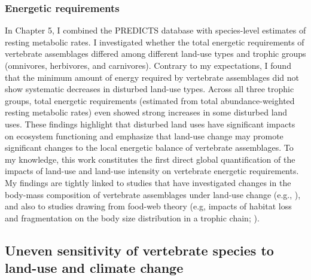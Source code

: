 \subsubsection{Energetic requirements}
In Chapter 5, I combined the PREDICTS database with species-level estimates of resting metabolic rates. I investigated whether the total energetic requirements of vertebrate assemblages differed among different land-use types and trophic groups (omnivores, herbivores, and carnivores). Contrary to my expectations, I found that the minimum amount of energy required by vertebrate assemblages did not show systematic decreases in disturbed land-use types. Across all three trophic groups, total energetic requirements (estimated from total abundance-weighted resting metabolic rates) even showed strong increases in some disturbed land uses. These findings highlight that disturbed land uses have significant impacts on ecosystem functioning and emphasize that land-use change may promote significant changes to the local energetic balance of vertebrate assemblages. To my knowledge, this work constitutes the first direct global quantification of the impacts of land-use and land-use intensity on vertebrate energetic requirements. My findings are tightly linked to studies that have investigated changes in the body-mass composition of vertebrate assemblages under land-use change (e.g., \citet{Newbold2020}), and also to studies drawing from food-web theory (e.g, impacts of habitat loss and fragmentation on the body size distribution in a trophic chain; \citet{Hillaert2020}). 



\subsection{Uneven sensitivity of vertebrate species to land-use and climate change}

